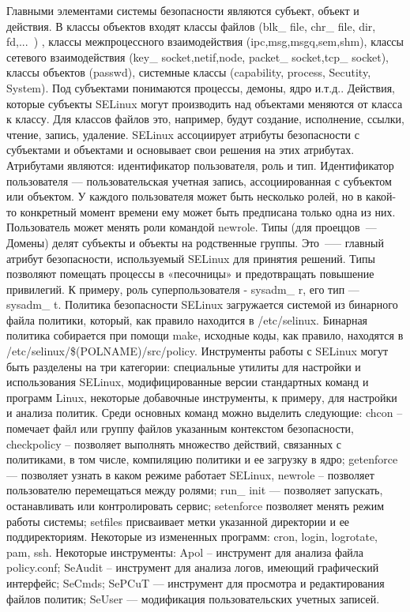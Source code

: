 Главными элементами системы безопасности 
являются субъект, объект и действия. В классы 
объектов входят классы файлов (blk\_ file, chr\_ 
file, dir, fd,...\ ) ,  классы межпроцессного 
взаимодействия (ipc,msg,msgq,sem,shm), классы 
сетевого взаимодействия (key\_ socket,netif,node,
packet\_ socket,tcp\_ socket), классы объектов 
(passwd), системные классы (capability, process,
Secutity, System). Под субъектами понимаются 
процессы, демоны, ядро и.т.д.. Действия, которые субъекты 
SELinux могут производить над объектами меняются
от класса к классу. Для классов файлов это, например, 
будут создание, исполнение, ссылки, чтение, запись, 
удаление. SELinux ассоциирует атрибуты безопасности 
с субъектами и объектами и основывает свои решения 
на этих атрибутах. Атрибутами являются: идентификатор 
пользователя, роль и тип. Идентификатор пользователя 
— пользовательская учетная запись, ассоциированная с 
субъектом или объектом. У каждого пользователя может 
быть несколько ролей, но в какой-то конкретный момент
времени ему может быть предписана только одна из них. 
Пользователь может менять роли командой newrole. Типы 
(для проеццов~--- Домены) делят субъекты и объекты на родственные 
группы. Это~--— главный атрибут безопасности, используемый 
SELinux для принятия решений. Типы позволяют помещать 
процессы в «песочницы» и предотвращать повышение 
привилегий. К примеру, роль суперпользователя - 
sysadm\_ r, его тип — sysadm\_ t. Политика безопасности 
SELinux загружается системой из бинарного файла политики,
который, как правило находится в /etc/selinux. 
Бинарная политика собирается при помощи make, исходные 
коды, как правило, находятся в /etc/selinux/\$(POLNAME)/src/policy.
Инструменты работы с SELinux могут быть разделены на 
три категории: специальные утилиты для настройки и 
использования SELinux, модифицированные версии стандартных 
команд и программ Linux, некоторые добавочные инструменты,
к примеру, для настройки и анализа политик. Среди основных 
команд можно выделить следующие: chcon – помечает файл или 
группу файлов указанным контекстом безопасности, checkpolicy
– позволяет выполнять множество действий, связанных с 
политиками, в том числе, компиляцию политики и ее загрузку 
в ядро; getenforce — позволяет узнать в каком режиме 
работает SELinux, newrole – позволяет пользователю 
перемещаться между ролями; run\_ init — позволяет 
запускать, останавливать или контролировать сервис; 
setenforce позволяет менять режим работы системы; 
setfiles присваивает метки указанной директории и ее 
поддиректориям. Некоторые из измененных программ: cron, 
login, logrotate, pam, ssh. Некоторые инструменты: Apol 
– инструмент для анализа файла policy.conf; SeAudit – 
инструмент для анализа логов, имеющий графический интерфейс; 
SeCmds; SePCuT — инструмент для просмотра и редактирования 
файлов политик; SeUser — модификация пользовательских 
учетных записей. 

